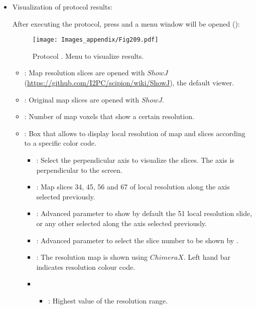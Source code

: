 \begin{itemize}
  \item Visualization of protocol results:
  
  After executing the protocol, press  and a menu window will be opened ():
  
  \begin{figure}[H]
     \centering 
     \captionsetup{width=.7\linewidth} 
     \texttt{[image: Images\_appendix/Fig209.pdf]}
     \caption{Protocol . Menu to visualize results.}
     \label{fig:app_localMonoRes_2}
    \end{figure}
    
   \begin{itemize}
     \item {}: Map resolution slices are opened with $ShowJ$ (\url{https://github.com/I2PC/scipion/wiki/ShowJ}), the default \scipion viewer.
     \item {}: Original map slices are opened with $ShowJ$.
     \item {}: Number of map voxels that show a certain resolution.
     \item {}: Box that allows to display local resolution of map and slices according to a specific color code.
     \begin{itemize}
        \item {}: Select the perpendicular axis to visualize the slices. The  axis is perpendicular to the screen.
        \item {}: Map slices 34, 45, 56 and 67 of local resolution along the axis selected previously.
        \item {}: Advanced parameter to show by default the 51 local resolution slide, or any other selected along the axis selected previously.
        \item {}:  Advanced parameter to select the slice number to be shown by .
        \item {}: The resolution map is shown using $ChimeraX$. Left hand bar indicates resolution colour code.
        \item
        \begin{itemize}
            \item {}: Highest value of the resolution range.

\end{itemize}
\end{itemize}
\end{itemize}
\end{itemize}
